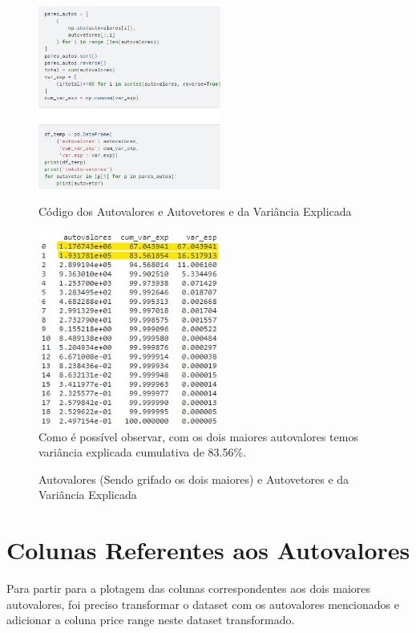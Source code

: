 \documentclass{report}
\begin{document}
\begin{figure}[htbp]
\centering
\caption{Código dos Autovalores e Autovetores e da Variância Explicada}
\includegraphics[width=6cm]{figures/cod_var_exp.jpg}
\label{figura com o código dos autovalores e autovetores e da variância explicada}
\end{figure}

\begin{figure}[htbp]
\centering
\caption{Autovalores (Sendo grifado os dois maiores) e Autovetores e da Variância Explicada}
\includegraphics[width=6cm]{figures/maiores_autovalores.jpg}
\label{figura com os autovalores (grifandos os dois maiores) e autovetores e da variância explicada}
\\Como é possível observar, com os dois maiores autovalores temos variância explicada cumulativa de 83.56\%.
\end{figure}

\section{Colunas Referentes aos Autovalores}
Para partir para a plotagem das colunas correspondentes aos dois maiores autovalores, foi preciso transformar o dataset com os autovalores mencionados e adicionar a coluna price range neste dataset transformado.
\end{document}
